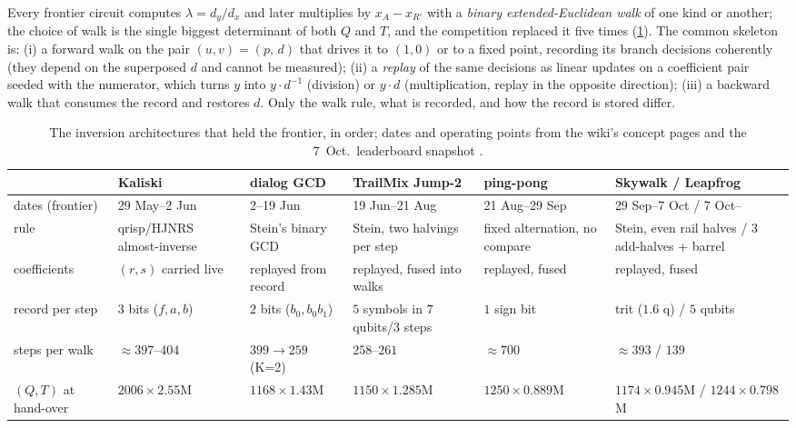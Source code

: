 Every frontier circuit computes $\lambda=d_y/d_x$ and later multiplies by $x_A-x_{R'}$ with a \emph{binary extended-Euclidean walk} of one kind or another; the choice of walk is the single biggest determinant of both $Q$ and $T$, and the competition replaced it five times (\cref{tab:inversions}). The common skeleton is: (i) a forward walk on the pair $(u,v)=(p,\,d)$ that drives it to $(1,0)$ or to a fixed point, recording its branch decisions coherently (they depend on the superposed $d$ and cannot be measured); (ii) a \emph{replay} of the same decisions as linear updates on a coefficient pair seeded with the numerator, which turns $y$ into $y\cdot d^{-1}$ (division) or $y\cdot d$ (multiplication, replay in the opposite direction); (iii) a backward walk that consumes the record and restores $d$. Only the walk rule, what is recorded, and how the record is stored differ.

\begin{table}[H]
\centering\scriptsize
\setlength{\tabcolsep}{3pt}
\begin{tabular}{@{}p{2.1cm}p{2.5cm}p{2.5cm}p{2.7cm}p{2.5cm}p{3.2cm}@{}}
\toprule
& Kaliski & dialog GCD & TrailMix Jump-2 & ping-pong & Skywalk / Leapfrog\\
\midrule
dates (frontier) & 29 May--2 Jun & 2--19 Jun & 19 Jun--21 Aug & 21 Aug--29 Sep & 29 Sep--7 Oct / 7 Oct--\\
rule & qrisp/HJNRS almost-inverse & Stein's binary GCD & Stein, two halvings per step & fixed alternation, no compare & Stein, even rail halves / 3 add-halves + barrel\\
coefficients & $(r,s)$ carried live & replayed from record & replayed, fused into walks & replayed, fused & replayed, fused\\
record per step & $3$ bits ($f,a,b$) & $2$ bits ($b_0,b_0b_1$) & $5$ symbols in $7$ qubits/$3$ steps & $1$ sign bit & trit ($1.6$ q) / $5$ qubits\\
steps per walk & $\approx 397$--$404$ & $399\to259$ (K=2) & $258$--$261$ & $\approx700$ & $\approx393$ / $139$\\
$(Q,T)$ at hand-over & $2006\times2.55$M & $1168\times1.43$M & $1150\times1.285$M & $1250\times0.889$M & $1174\times0.945$M / $1244\times0.798$M\\
\bottomrule
\end{tabular}
\caption{The inversion architectures that held the \ecdsafail{} frontier, in order; dates and operating points from the wiki's concept pages and the 7~Oct.\ leaderboard snapshot \cite{ecdsafail-wiki}.}
\label{tab:inversions}
\end{table}

